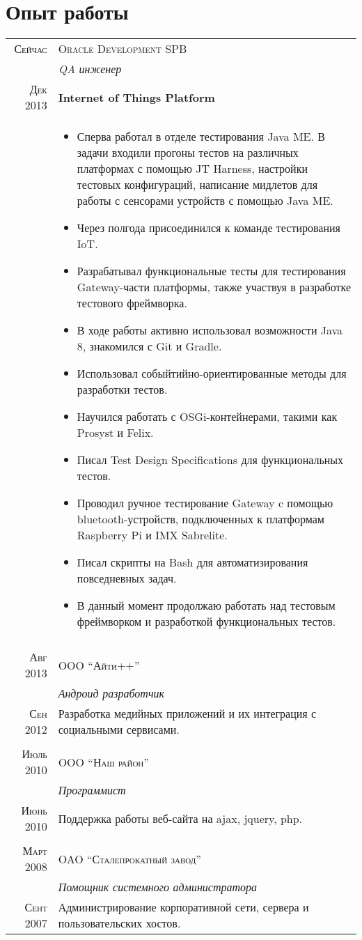 \documentclass[a4paper,10pt]{article}
\begin{document}
\section{Опыт работы}
	\begin{tabular}{r|p{11cm}}
	  \textsc{Сейчас} & \textsc{Oracle Development SPB} \\ & \emph{QA инженер} \\
	  \textsc{Дек 2013}&\textbf{Internet of Things Platform}\\&
	  \begin{itemize}
	  	\item Сперва работал в отделе тестирования Java ME. В задачи входили прогоны тестов на различных платформах с помощью JT Harness, настройки тестовых конфигураций, написание мидлетов для работы с сенсорами устройств с помощью Java ME. 
		\item Через полгода присоединился к команде тестирования IoT.
		\item Разрабатывал функциональные тесты для тестирования Gateway-части платформы, также участвуя в разработке тестового фреймворка.
		\item В ходе работы активно использовал возможности Java 8, знакомился с Git и Gradle.
		\item Использовал собыйтийно-ориентированные методы для разработки тестов.
		\item Научился работать с OSGi-контейнерами, такими как Prosyst и Felix.
		\item Писал Test Design Specifications для функциональных тестов.
		\item Проводил ручное тестирование Gateway c помощью bluetooth-устройств, подключенных к платформам Raspberry Pi и IMX Sabrelite.
		\item Писал скрипты на Bash для автоматизирования повседневных задач.
		\item В данный момент продолжаю работать над тестовым фреймворком и разработкой функциональных тестов.
	\end{itemize}
	  \\
	    \multicolumn{2}{c}{} \\
		\textsc{Авг 2013}& \textsc{OOO ``Айти++''}\\&\emph{Андроид разработчик} \\
		\textsc{Сен 2012}& Разработка медийных приложений и их интеграция с социальными сервисами.\\
		  \multicolumn{2}{c}{} \\
		\textsc{Июль 2010} & 	\textsc{OOO ``Наш район''}\\&\emph{Программист} \\
		\textsc{Июнь 2010}& Поддержка работы веб-сайта на ajax, jquery, php.\\
		  \multicolumn{2}{c}{} \\
		\textsc{Март 2008} & 	\textsc{OAO ``Сталепрокатный завод''}\\&\emph{Помощник системного администратора}\\
		\textsc{Сент 2007}&Администрирование корпоративной сети, сервера и пользовательских хостов.
		\end{tabular}
\end{document}

